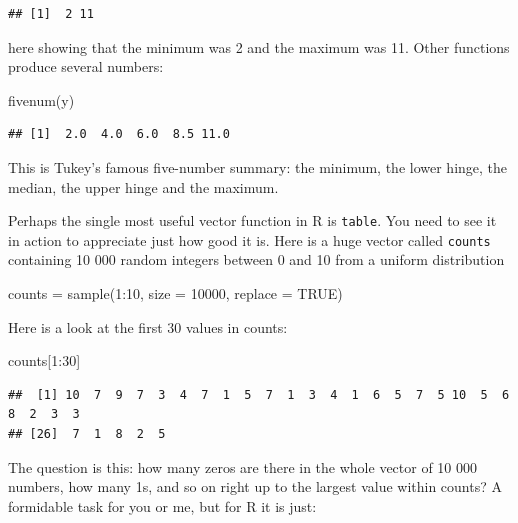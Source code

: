 \documentclass[
]{book}
\newenvironment{Shaded}{\begin{snugshade}}{\end{snugshade}}
\newcommand{\AttributeTok}[1]{\textcolor[rgb]{0.77,0.63,0.00}{#1}}
\newcommand{\ConstantTok}[1]{\textcolor[rgb]{0.00,0.00,0.00}{#1}}
\newcommand{\DecValTok}[1]{\textcolor[rgb]{0.00,0.00,0.81}{#1}}
\newcommand{\FunctionTok}[1]{\textcolor[rgb]{0.00,0.00,0.00}{#1}}
\newcommand{\NormalTok}[1]{#1}
\newcommand{\OtherTok}[1]{\textcolor[rgb]{0.56,0.35,0.01}{#1}}
\newcommand{\SpecialCharTok}[1]{\textcolor[rgb]{0.00,0.00,0.00}{#1}}
\theoremstyle{definition}
\theoremstyle{definition}
\theoremstyle{definition}
\theoremstyle{definition}
\theoremstyle{remark}
\begin{document}
\begin{verbatim}
## [1]  2 11
\end{verbatim}

here showing that the minimum was 2 and the maximum was 11. Other functions produce several numbers:

\begin{Shaded}
\begin{Highlighting}[]
\FunctionTok{fivenum}\NormalTok{(y)}
\end{Highlighting}
\end{Shaded}

\begin{verbatim}
## [1]  2.0  4.0  6.0  8.5 11.0
\end{verbatim}

This is Tukey's famous five-number summary: the minimum, the lower hinge, the median, the upper hinge and the maximum.

Perhaps the single most useful vector function in R is \texttt{table}. You need to see it in action to appreciate just how good it is. Here is a huge vector called \texttt{counts} containing 10 000 random integers between 0 and 10 from a uniform distribution

\begin{Shaded}
\begin{Highlighting}[]
\NormalTok{counts }\OtherTok{=} \FunctionTok{sample}\NormalTok{(}\DecValTok{1}\SpecialCharTok{:}\DecValTok{10}\NormalTok{, }\AttributeTok{size =} \DecValTok{10000}\NormalTok{, }\AttributeTok{replace =} \ConstantTok{TRUE}\NormalTok{)}
\end{Highlighting}
\end{Shaded}

Here is a look at the first 30 values in counts:

\begin{Shaded}
\begin{Highlighting}[]
\NormalTok{counts[}\DecValTok{1}\SpecialCharTok{:}\DecValTok{30}\NormalTok{]}
\end{Highlighting}
\end{Shaded}

\begin{verbatim}
##  [1] 10  7  9  7  3  4  7  1  5  7  1  3  4  1  6  5  7  5 10  5  6  8  2  3  3
## [26]  7  1  8  2  5
\end{verbatim}

The question is this: how many zeros are there in the whole vector of 10 000 numbers, how many 1s, and so on right up to the largest value within counts? A formidable task for you or me, but for R it is just:
\end{document}
